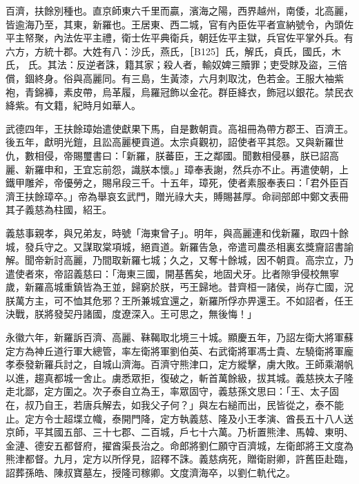 \begin{pinyinscope}
百濟，扶餘別種也。直京師東六千里而贏，濱海之陽，西界越州，南倭，北高麗，皆逾海乃至，其東，新羅也。王居東、西二城，官有內臣佐平者宣納號令，內頭佐平主帑聚，內法佐平主禮，衛士佐平典衛兵，朝廷佐平主獄，兵官佐平掌外兵。有六方，方統十郡。大姓有八：沙氏，燕氏，［B125］氏，解氏，貞氏，國氏，木氏，
 氏。其法：反逆者誅，籍其家；殺人者，輸奴婢三贖罪；吏受賕及盜，三倍償，錮終身。俗與高麗同。有三島，生黃漆，六月刺取沈，色若金。王服大袖紫袍，青錦褲，素皮帶，烏革履，烏羅冠飾以金花。群臣絳衣，飾冠以銀花。禁民衣絳紫。有文籍，紀時月如華人。



 武德四年，王扶餘璋始遣使獻果下馬，自是數朝貢。高祖冊為帶方郡王、百濟王。後五年，獻明光鎧，且訟高麗梗貢道。太宗貞觀初，詔使者平其怨。又與新羅世仇，數相侵，帝賜璽書曰：「新羅，朕蕃臣，王之鄰國。聞數相侵暴，朕已詔高麗、新羅申和，王宜忘前怨，識朕本懷。」璋奉表謝，然兵亦不止。再遣使朝，上鐵甲雕斧，帝優勞之，賜帛段三千。十五年，璋死，使者素服奉表曰：「君外臣百濟王扶餘璋卒。」帝為舉哀玄武門，贈光祿大夫，賻賜甚厚。命祠部郎中鄭文表冊其子義慈為柱國，紹王。



 義慈事親孝，與兄弟友，時號「海東曾子」。明年，與高麗連和伐新羅，取四十餘城，發兵守之。又謀取棠項城，絕貢道。新羅告急，帝遣司農丞相裏玄獎齎詔書諭解。聞帝新討高麗，乃間取新羅七城；久之，又奪十餘城，因不朝貢。高宗立，乃遣使者來，帝詔義慈曰：「海東三國，開基舊矣，地固犬牙。比者隙爭侵校無寧歲，新羅高城重鎮皆為王並，歸窮於朕，丐王歸地。昔齊桓一諸侯，尚存亡國，況朕萬方主，可不恤其危邪？王所兼城宜還之，新羅所俘亦畀還王。不如詔者，任王決戰，朕將發契丹諸國，度遼深入。王可思之，無後悔！」



 永徽六年，新羅訴百濟、高麗、靺鞨取北境三十城。顯慶五年，乃詔左衛大將軍蘇定方為神丘道行軍大總管，率左衛將軍劉伯英、右武衛將軍馮士貴、左驍衛將軍龐孝泰發新羅兵討之，自城山濟海。百濟守熊津口，定方縱擊，虜大敗。王師乘潮帆以進，趨真都城一舍止。虜悉眾拒，復破之，斬首萬餘級，拔其城。義慈挾太子隆走北鄙，定方圍之。次子泰自立為王，率眾固守，義慈孫文思曰：「王、太子固在，叔乃自王，若唐兵解去，如我父子何？」與左右縋而出，民皆從之，泰不能止。定方令士超堞立幟，泰開門降，定方執義慈、隆及小王孝演、酋長五十八人送京師，平其國五部、三十七郡、二百城，戶七十六萬。乃析置熊津、馬韓、東明、金漣、德安五都督府，擢酋渠長治之。命郎將劉仁願守百濟城，左衛郎將王文度為熊津都督。九月，定方以所俘見，詔釋不誅。義慈病死，贈衛尉卿，許舊臣赴臨，詔葬孫皓、陳叔寶墓左，授隆司稼卿。文度濟海卒，以劉仁軌代之。




\end{pinyinscope}
